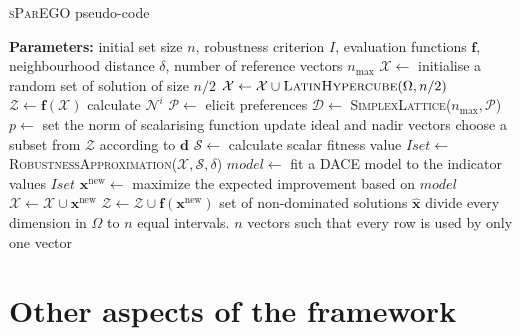\documentclass[10pt]{llncs}
\newcommand{\brr}[1]{{\left({#1}\right)}} %
\newcommand{\vx}{\ensuremath{\mathbf{x}}} %
\newcommand{\vf}{\ensuremath{\mathbf{f}}} %
\newcommand{\vd}{\ensuremath{\mathbf{d}}} %
\newcommand{\DSet}{\ensuremath{\mathcal{D}}} %
\newcommand{\NSet}{\ensuremath{\mathcal{N}}} %
\newcommand{\XSet}{\ensuremath{\mathcal{X}}} %
\newcommand{\ZSet}{\ensuremath{\mathcal{Z}}} %
\newcommand{\SSet}{\ensuremath{\mathcal{S}}} %
\newcommand{\Pref}{\ensuremath{\mathcal{P}}} %
\begin{document}
\begin{algorithm}
\caption{\textsc{sParEGO} pseudo-code}
\label{alg:sParEGO}
\begin{algorithmic}[1]
	\Statex \textbf{Parameters:} initial set size $n$, robustness criterion $I$,
	\Statex \hspace{22mm} evaluation functions $\vf$, neighbourhood distance $\delta$,
	\Statex \hspace{22mm} number of reference vectors $n_\text{max}$
	\State $\XSet \leftarrow$ initialise a random set of solution of size $n/2$
	\label{line:randInit}
	\State $\XSet \leftarrow \XSet \cup \textsc{LatinHypercube}\brr{\Omega,n/2}$ 
	\label{line:LHS}
	\State $\ZSet \leftarrow \vf\brr{\XSet}$ 
	\ForAll{$\vx^i\in\XSet$}
		\State calculate $\NSet^i$ 
	\EndFor
		\State $\Pref \leftarrow$ elicit preferences
		\State $\DSet \leftarrow$ \textsc{SimplexLattice}($n_\text{max},\Pref$) 
		\State $p \leftarrow$ set the norm of scalarising function
		\ForAll{$\vd\in\DSet$}
			\State update ideal and nadir vectors
			\State choose a subset from $\ZSet$ according to \vd
			\label{line:subset}
			\State $\SSet \leftarrow$ calculate scalar fitness value 
			\State $Iset \leftarrow$ \textsc{RobustnessApproximation($\XSet,\SSet,\delta$)} 
			\State $model \leftarrow$ fit a DACE model to the indicator values $Iset$
			\State $\vx^\text{new} \leftarrow$ maximize the expected improvement based on $model$ \label{line:optimize model}
			\State $\XSet \leftarrow \XSet \cup \vx^\text{new}$
			\State $\ZSet \leftarrow \ZSet \cup \vf\brr{\vx^\text{new}}$ 
		\EndFor
	\EndWhile
	\State \Return set of non-dominated solutions $\hat{\vx}$
\Statex
{} \label{state:latin}
	\State divide every dimension in $\Omega$ to $n$ equal intervals.
	\State \Return $n$ vectors such that every row is used by only one vector
\EndProcedure
\end{algorithmic}
\end{algorithm}

\section{Other aspects of the framework}
\label{sec:Other aspects}
\end{document}
